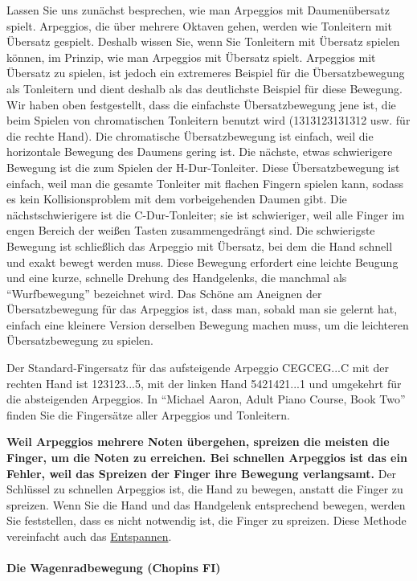 Lassen Sie uns zunächst besprechen, wie man Arpeggios mit Daumenübersatz spielt.
Arpeggios, die über mehrere Oktaven gehen, werden wie Tonleitern mit Übersatz gespielt.
Deshalb wissen Sie, wenn Sie Tonleitern mit Übersatz spielen können, im Prinzip, wie man Arpeggios mit Übersatz spielt.
Arpeggios mit Übersatz zu spielen, ist jedoch ein extremeres Beispiel für die Übersatzbewegung als Tonleitern und dient deshalb als das deutlichste Beispiel für diese Bewegung.
Wir haben oben festgestellt, dass die einfachste Übersatzbewegung jene ist, die beim Spielen von chromatischen Tonleitern benutzt wird (1313123131312 usw. für die rechte Hand).
Die chromatische Übersatzbewegung ist einfach, weil die horizontale Bewegung des Daumens gering ist.
Die nächste, etwas schwierigere Bewegung ist die zum Spielen der H-Dur-Tonleiter.
Diese Übersatzbewegung ist einfach, weil man die gesamte Tonleiter mit flachen Fingern spielen kann, sodass es kein Kollisionsproblem mit dem vorbeigehenden Daumen gibt.
Die nächstschwierigere ist die C-Dur-Tonleiter; sie ist schwieriger, weil alle Finger im engen Bereich der weißen Tasten zusammengedrängt sind.
Die schwierigste Bewegung ist schließlich das Arpeggio mit Übersatz, bei dem die Hand schnell und exakt bewegt werden muss.
Diese Bewegung erfordert eine leichte Beugung und eine kurze, schnelle Drehung des Handgelenks, die manchmal als \enquote{Wurfbewegung} bezeichnet wird.
Das Schöne am Aneignen der Übersatzbewegung für das Arpeggios ist, dass man, sobald man sie gelernt hat, einfach eine kleinere Version derselben Bewegung machen muss, um die leichteren Übersatzbewegung zu spielen.

Der Standard-Fingersatz für das aufsteigende Arpeggio CEGCEG...C mit der rechten Hand ist 123123...5, mit der linken Hand 5421421...1 und umgekehrt für die absteigenden Arpeggios.
In \enquote{Michael Aaron, Adult Piano Course, Book Two} finden Sie die Fingersätze aller Arpeggios und Tonleitern.

\textbf{Weil Arpeggios mehrere Noten übergehen, spreizen die meisten die Finger, um die Noten zu erreichen.
Bei schnellen Arpeggios ist das ein Fehler, weil das Spreizen der Finger ihre Bewegung verlangsamt.}
Der Schlüssel zu schnellen Arpeggios ist, die Hand zu bewegen, anstatt die Finger zu spreizen.
Wenn Sie die Hand und das Handgelenk entsprechend bewegen, werden Sie feststellen, dass es nicht notwendig ist, die Finger zu spreizen.
Diese Methode vereinfacht auch das \hyperref[c1ii14]{Entspannen}.


\paragraph{Die Wagenradbewegung (Chopins FI)}
\label{c1iii5wagen}

